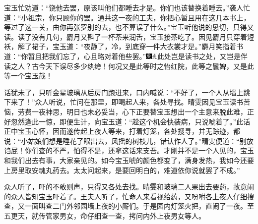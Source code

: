 宝玉忙劝道：``饶他去罢，原该叫他们都睡去才是。你们也该替换着睡去。''袭人忙道：``小祖宗，你只顾你的罢。通共这一夜的工夫，你把心暂且用在这几本书上，等过了这一关，由你再张罗别的去，也不算误了什么。''宝玉听他说的恳切，只得又读。读了没有几句，麝月又斟了一杯茶来润舌，宝玉接茶吃了。因见麝月只穿着短袄，解了裙子，宝玉道：``夜静了，冷，到底穿一件大衣裳才是。''麝月笑指着书道：``你暂且把我们忘了，心且略对着他些罢。''{\includegraphics[width=3mm]{../Images/00004}\includegraphics[width=3mm]{../Images/00012}\footnotesize \kaishu 此处岂是读书之处，又岂是伴读之人？古今天下误尽多少纨绔！何况又是此等时之怡红院，此等之鬟婢，又是此等一个宝玉哉！}

话犹未了，只听金星玻璃从后房门跑进来，口内喊说：``不好了，一个人从墙上跳下来了！''众人听说，忙问在那里，即喝起人来，各处寻找。晴雯因见宝玉读书苦恼，劳费一夜神思，明日也未必妥当，心下正要替宝玉想出一个主意来脱此难，正好忽然逢此一惊，即便生计，向宝玉道：``趁这个机会快装病，只说唬着了。''此话正中宝玉心怀，因而遂传起上夜人等来，打着灯笼，各处搜寻，并无踪迹，都说：``小姑娘们想是睡花了眼出去，风摇的树枝儿，错认作人了。''晴雯便道：``别放诌屁！你们查的不严，怕得不是，还拿这话来支吾。才刚并不是一个人见的，宝玉和我们出去有事，大家亲见的。如今宝玉唬的颜色都变了，满身发热，我如今还要上房里取安魂丸药去。太太问起来，是要回明白的，难道依你说就罢了不成。''

众人听了，吓的不敢则声，只得又各处去找。晴雯和玻璃二人果出去要药，故意闹的众人皆知宝玉吓着了。王夫人听了，忙命人来看视给药，又吩咐各上夜人仔细搜查，又一面叫查二门外邻园墙上夜的小厮们。于是园内灯笼火把，直闹了一夜。至五更天，就传管家男女，命仔细查一查，拷问内外上夜男女等人。

